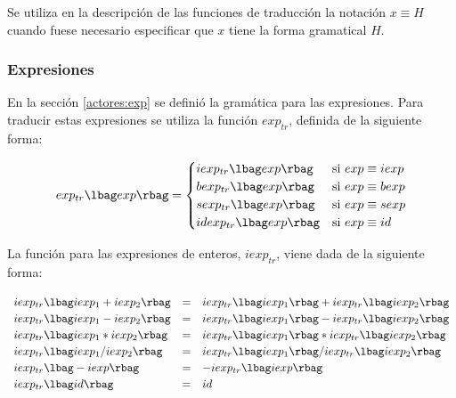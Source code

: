 Se utiliza en la descripción de las funciones de traducción la notación $x \equiv H$ cuando fuese necesario especificar que $x$ tiene la forma gramatical $H$.

\subsubsection*{Expresiones}
En la sección \ref{actores:exp} se definió la gramática para las expresiones. Para traducir estas expresiones se utiliza la función $exp_{tr}$, definida de la siguiente forma:
\newcommand{\func}[1]{\lbag #1 \rbag}


\begin{equation*}
  exp_{tr} \func{exp} =
  \setlength{\arraycolsep}{0pt}
  \renewcommand{\arraystretch}{1.2}
  \left\{\begin{array}{l @{\quad} l}
        iexp_{tr}\func{exp}     & \text{si $exp \equiv iexp$} \\
        bexp_{tr}\func{exp}     & \text{si $exp \equiv bexp$} \\
        sexp_{tr}\func{exp}     & \text{si $exp \equiv sexp$} \\
        idexp_{tr}\func{exp}    & \text{si $exp \equiv id$} \\
  \end{array}\right.
\end{equation*}

La función para las expresiones de enteros, $iexp_{tr}$, viene dada de la siguiente forma:

\begin{equation*}
\begin{array}{l c l}
iexp_{tr}\func{iexp_1 + iexp_2} &=& iexp_{tr}\func{iexp_1} + iexp_{tr}\func{iexp_2} \\
iexp_{tr}\func{iexp_1 - iexp_2} &=& iexp_{tr}\func{iexp_1} - iexp_{tr}\func{iexp_2} \\
iexp_{tr}\func{iexp_1 * iexp_2} &=& iexp_{tr}\func{iexp_1} * iexp_{tr}\func{iexp_2} \\ 
iexp_{tr}\func{iexp_1 / iexp_2} &=& iexp_{tr}\func{iexp_1} / iexp_{tr}\func{iexp_2} \\
iexp_{tr}\lbag - iexp \rbag &=& - iexp_{tr}\lbag iexp \rbag \\
iexp_{tr}\lbag id \rbag &=& id
\end{array}
\end{equation*}

